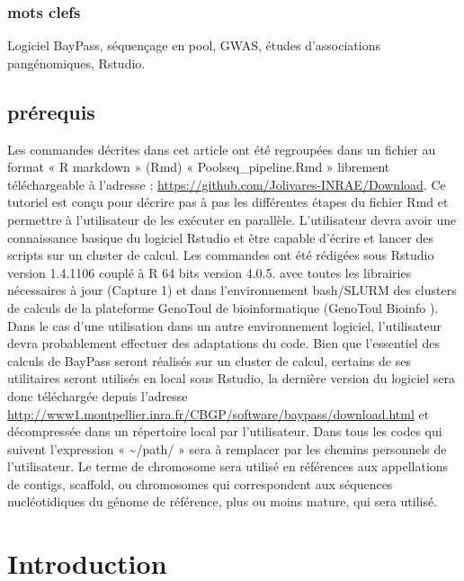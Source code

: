 \documentclass[
  openany]{book}
\begin{document}
\hypertarget{mots-clefs-1}{%
\subsection*{mots clefs}\label{mots-clefs-1}}

Logiciel BayPass, séquençage en pool, GWAS, études d'associations pangénomiques, Rstudio.

\hypertarget{pruxe9requis-1}{%
\section*{prérequis}\label{pruxe9requis-1}}

Les commandes décrites dans cet article ont été regroupées dans un fichier au format « R markdown » (Rmd) « Poolseq\_pipeline.Rmd » librement téléchargeable à l'adresse : \url{https://github.com/Jolivares-INRAE/Download}. Ce tutoriel est conçu pour décrire pas à pas les différentes étapes du fichier Rmd et permettre à l'utilisateur de les exécuter en parallèle.
L'utilisateur devra avoir une connaissance basique du logiciel Rstudio et être capable d'écrire et lancer des scripts sur un cluster de calcul.
Les commandes ont été rédigées sous Rstudio version 1.4.1106 couplé à R 64 bits version 4.0.5. avec toutes les librairies nécessaires à jour (Capture 1) et dans l'environnement bash/SLURM des clusters de calculs de la plateforme GenoToul de bioinformatique (GenoToul Bioinfo ). Dans le cas d'une utilisation dans un autre environnement logiciel, l'utilisateur devra probablement effectuer des adaptations du code.
Bien que l'essentiel des calculs de BayPass seront réalisés sur un cluster de calcul, certains de ses utilitaires seront utilisés en local sous Rstudio, la dernière version du logiciel sera donc téléchargée depuis l'adresse \url{http://www1.montpellier.inra.fr/CBGP/software/baypass/download.html} et décompressée dans un répertoire local par l'utilisateur.
Dans tous les codes qui suivent l'expression « \textasciitilde/path/ » sera à remplacer par les chemins personnels de l'utilisateur.
Le terme de chromosome sera utilisé en références aux appellations de contigs, scaffold, ou chromosomes qui correspondent aux séquences nucléotidiques du génome de référence, plus ou moins mature, qui sera utilisé.

\hypertarget{introduction}{%
\chapter*{Introduction}\label{introduction}}
\end{document}

